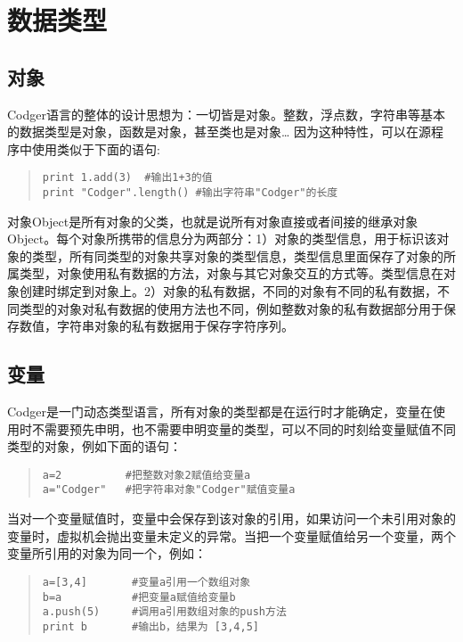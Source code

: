 \section{数据类型}
\subsection{对象}
Codger语言的整体的设计思想为：一切皆是对象。整数，浮点数，字符串等基本的数据类型是对象，函数是对象，甚至类也是对象\ldots{} 因为这种特性，可以在源程序中使用类似于下面的语句:
\begin{quote}
\begin{verbatim}
print 1.add(3)  #输出1+3的值
print "Codger".length() #输出字符串"Codger"的长度
\end{verbatim}
\end{quote}
对象Object是所有对象的父类，也就是说所有对象直接或者间接的继承对象Object。每个对象所携带的信息分为两部分：1）对象的类型信息，用于标识该对象的类型，所有同类型的对象共享对象的类型信息，类型信息里面保存了对象的所属类型，对象使用私有数据的方法，对象与其它对象交互的方式等。类型信息在对象创建时绑定到对象上。2）对象的私有数据，不同的对象有不同的私有数据，不同类型的对象对私有数据的使用方法也不同，例如整数对象的私有数据部分用于保存数值，字符串对象的私有数据用于保存字符序列。
\subsection{变量}
Codger是一门动态类型语言，所有对象的类型都是在运行时才能确定，变量在使用时不需要预先申明，也不需要申明变量的类型，可以不同的时刻给变量赋值不同类型的对象，例如下面的语句：
\begin{quote}
\begin{verbatim}
a=2          #把整数对象2赋值给变量a
a="Codger"   #把字符串对象"Codger"赋值变量a 
\end{verbatim}
\end{quote}
当对一个变量赋值时，变量中会保存到该对象的引用，如果访问一个未引用对象的变量时，虚拟机会抛出变量未定义的异常。当把一个变量赋值给另一个变量，两个变量所引用的对象为同一个，例如：
\begin{quote}
\begin{verbatim}
a=[3,4]       #变量a引用一个数组对象
b=a           #把变量a赋值给变量b
a.push(5)     #调用a引用数组对象的push方法
print b       #输出b，结果为 [3,4,5]
\end{verbatim}
\end{quote}
